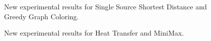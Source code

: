 \documentclass[10pt]{article}
\begin{document}
\begin{figure}[h]
\begin{center}
\end{center}
\caption{New experimental results for Single Source Shortest Distance and Greedy Graph Coloring.}
\label{fig:res2}
\end{figure}

\begin{figure}[h]
\begin{center}
\end{center}
\begin{center}
\end{center}
\caption{New experimental results for Heat Transfer and MiniMax.}
\label{fig:res3}
\end{figure}
\end{document}
